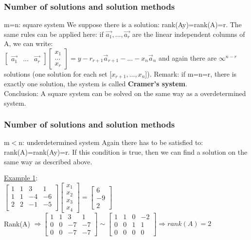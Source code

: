\begin{frame}
	\frametitle{Number of solutions and solution methods}
	\begin{block}{m=n: square system}
		We suppose there is a solution: rank(Ay)=rank(A)=r. The same rules can be applied here: if $\overrightarrow{a_1},...,\overrightarrow{a_r}$ are the linear independent columns of A, we can write:\\
		$\begin{bmatrix}
		\overrightarrow{a_1} & ... & \overrightarrow{a_r}
		\end{bmatrix} \begin{bmatrix}
		x_1\\...\\x_r
		\end{bmatrix}=y-r_{r+1}\overrightarrow{a}_{r+1}-...-x_n\overrightarrow{a}_n$ and again there are $\infty^{n-r}$ solutions (one solution for each set [$x_{r+1},...,x_{n}$]).\vspace{4mm}
		Remark: if m=n=r, there is exactly one solution, the system is called \textbf{Cramer's system}.\\
		Conclusion: A square system can be solved on the same way as a overdetermined system. 
	\end{block}
\end{frame}

\begin{frame}
	\frametitle{Number of solutions and solution methods}
	\begin{block}{m$<$n: underdetermined system}
		Again there has to be satisfied to: rank(A)=rank(Ay)=r. If this condition is true, then we can find a solution on the same way as described above.\vspace{4mm} 
		
		\underline{Example 1}:\\
		$\begin{bmatrix}
		1 & 1 & 3 & 1\\
		1 & 1 & -4 & -6\\
		2 & 2 & -1 & -5\\
		\end{bmatrix}\begin{bmatrix}
		x_1\\x_2\\x_3\\x_4\end{bmatrix}=\begin{bmatrix}
		6\\-9\\2
		\end{bmatrix}$\\
		Rank(A) $\Rightarrow \begin{bmatrix}
		1 & 1 & 3 & 1\\
		0 & 0 & -7 & -7\\
		0 & 0 & -7 & -7
		\end{bmatrix} \sim \begin{bmatrix}
		1 & 1 & 0 & -2\\
		0 & 0 & 1 & 1\\
		0 & 0& 0& 0
		\end{bmatrix} \Rightarrow rank(A)=2$
	\end{block}
\end{frame}

